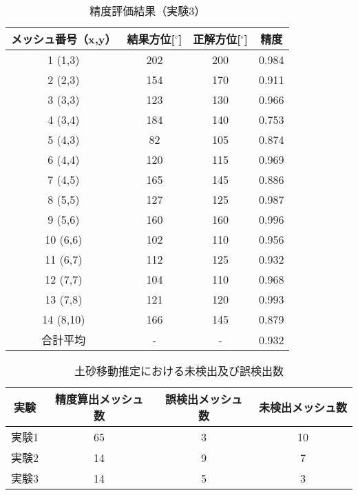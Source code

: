     \begin{table}[tbp]
      \centering
      \caption{精度評価結果（実験3）}
      \label{精度評価結果（実験3）}
      \begin{tabular}{cccc}
        \hline
        \textbf{メッシュ番号（x,y）} & \textbf{結果方位[$^{\circ}$]} & \textbf{正解方位[$^{\circ}$]} & \textbf{精度} \\
        \hline  \hline
        1 (1,3) & 202 & 200 & 0.984 \\
        2 (2,3) & 154 & 170 & 0.911 \\
        3 (3,3) & 123 & 130 & 0.966 \\
        4 (3,4) & 184 & 140 & 0.753 \\
        5 (4,3) & 82 & 105 & 0.874 \\
        6 (4,4) & 120 & 115 & 0.969 \\
        7 (4,5) & 165 & 145 & 0.886 \\
        8 (5,5) & 127 & 125 & 0.987 \\
        9 (5,6) & 160 & 160 & 0.996 \\
        10 (6,6) & 102 & 110 & 0.956 \\
        11 (6,7) & 112 & 125 & 0.932 \\
        12 (7,7) & 104 & 110 & 0.968 \\
        13 (7,8) & 121 & 120 & 0.993 \\
        14 (8,10) & 166 & 145 & 0.879 \\
        合計平均 & - & - & 0.932 \\
        \hline
      \end{tabular}
    \end{table}

    \begin{table}[tbp]
      \centering
      \caption{土砂移動推定における未検出及び誤検出数}
      \label{土砂移動推定精度}
      \begin{tabular}{cccc}
        \hline
        \textbf{実験} & \textbf{精度算出メッシュ数} & \textbf{誤検出メッシュ数} & \textbf{未検出メッシュ数} \\
        \hline  \hline
        実験1 & 65 & 3 & 10 \\
        実験2 & 14 & 9 & 7 \\
        実験3 & 14 & 5 & 3 \\ \hline
      \end{tabular}
    \end{table}




